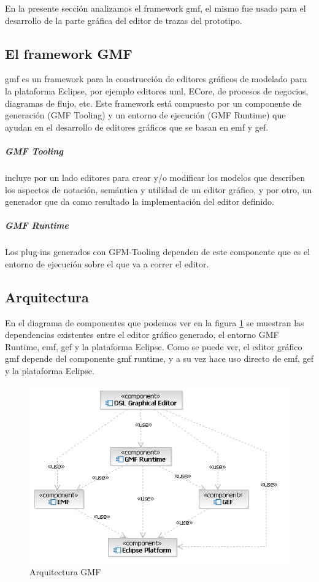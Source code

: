 \documentclass[a4paper,12pt,oneside,spanish]{book}
\begin{document}
En la presente sección analizamos el framework \gls{gmf}, el mismo fue usado para el desarrollo de la parte gráfica del editor de trazas del prototipo.

\subsection{El framework GMF}

\gls{gmf} es un framework para la construcción de editores gráficos de modelado para la plataforma Eclipse, por ejemplo editores \gls{uml}, ECore, de procesos de negocios, diagramas de flujo, etc. Este framework está compuesto por un componente de generación (GMF Tooling) y un entorno de ejecución (GMF Runtime) que ayudan en el desarrollo de editores gráficos que se basan en \gls{emf} y \gls{gef}.

\subparagraph{GMF Tooling} incluye por un lado editores para crear y/o modificar los modelos que describen los aspectos de notación, semántica y utilidad de un editor gráfico, y por otro, un generador que da como resultado la implementación del editor definido.

\subparagraph{GMF Runtime} Los plug-ins generados con GFM-Tooling dependen de este componente que es el entorno de ejecución sobre el que va a correr el editor.

\subsection{Arquitectura}

En el diagrama de componentes que podemos ver en la figura \ref{fig:GMFArquitectura} se muestran las dependencias existentes entre el editor gráfico generado, el entorno GMF Runtime, \gls{emf}, \gls{gef} y la plataforma Eclipse. Como se puede ver, el editor gráfico \gls{gmf} depende del componente \gls{gmf} runtime, y a su vez hace uso directo de \gls{emf}, \gls{gef} y la plataforma Eclipse.


\begin{figure}[hbtp]
\centering
\includegraphics[scale=.75]{./img/GMFArquitectura}
\caption{Arquitectura GMF}
\label{fig:GMFArquitectura}
\end{figure}
\end{document}
